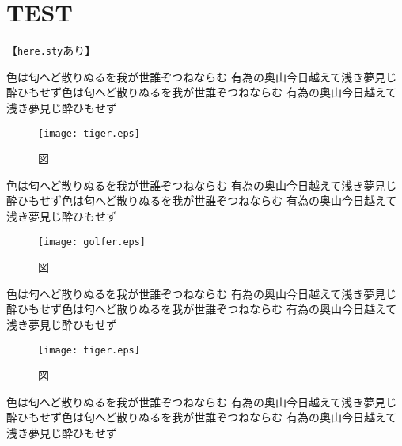 \documentclass[a5paper]{jarticle}
\def\iroh{色は匂へど散りぬるを我が世誰ぞつねならむ
有為の奥山今日越えて浅き夢見じ酔ひもせず}
\begin{document}
\section{TEST}

【\verb|here.sty|あり】

\iroh\iroh

\begin{figure}[H]
\caption{図}
\centering\texttt{[image: tiger.eps]}
\end{figure}

\iroh\iroh

\begin{figure}[H]
\caption{図}
\centering\texttt{[image: golfer.eps]}
\end{figure}

\iroh\iroh

\begin{figure}[H]
\caption{図}
\centering\texttt{[image: tiger.eps]}
\end{figure}

\iroh\iroh
\end{document}
